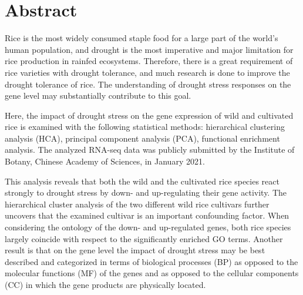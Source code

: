 \section{Abstract}

Rice is the most widely consumed staple food for a large part of the world's human population, and drought is the most imperative and major limitation for rice production in rainfed ecosystems. Therefore, there is a great requirement of rice varieties with drought tolerance, and much research is done to improve the drought tolerance of rice. The understanding of drought stress responses on the gene level may substantially contribute to this goal.

Here, the impact of drought stress on the gene expression of wild and cultivated rice is examined with the following statistical methods: hierarchical clustering analysis (HCA), principal component analysis (PCA), functional enrichment analysis. The analyzed RNA-seq data was publicly submitted by the Institute of Botany, Chinese Academy of Sciences, in January 2021.

This analysis reveals that both the wild and the cultivated rice species react strongly to drought stress by down- and up-regulating their gene activity. The hierarchical cluster analysis of the two different wild rice cultivars further uncovers that the examined cultivar is an important confounding factor. When considering the ontology of the down- and up-regulated genes, both rice species largely coincide with respect to the significantly enriched GO terms. Another result is that on the gene level the impact of drought stress may be best described and categorized in terms of biological processes (BP) as opposed to the molecular functions (MF) of the genes and as opposed to the cellular components (CC) in which the gene products are physically located.